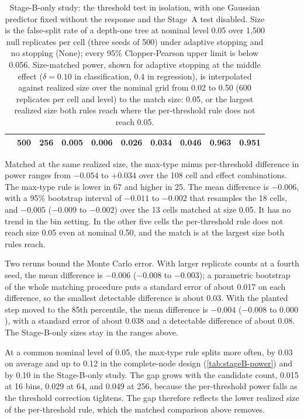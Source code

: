 \begin{table}[!htbp]
\begin{tabular}{@{}lrrrrrrrrr@{}}
     & 500 & 256 & 0.005 & 0.006 & 0.026 & 0.034 & 0.046 & 0.963 & 0.951 \\
    \bottomrule
  \end{tabular}
  \caption{Stage-B-only study: the threshold test in isolation, with one
  Gaussian predictor fixed without the response and the Stage~A test disabled.
  Size is the false-split rate of a depth-one tree at nominal level 0.05 over
  1,500 null replicates per cell (three seeds of 500) under adaptive stopping
  and no stopping (None); every 95\% Clopper-Pearson upper limit is below
  0.056. Size-matched power, shown for adaptive stopping at the middle effect
  ($\delta = 0.10$ in classification, $0.4$ in regression), is interpolated
  against realized size over the nominal grid from 0.02 to 0.50 (600 replicates
  per cell and level) to the match size: 0.05, or the largest realized size
  both rules reach where the per-threshold rule does not reach 0.05.}
  \label{tab:stageB-only}
\end{table}

Matched at the same realized size, the max-type minus per-threshold difference
in power ranges from $-0.054$ to $+0.034$ over the 108 cell and effect
combinations. The max-type rule is lower in 67 and higher in 25. The mean
difference is $-0.006$, with a 95\% bootstrap interval of $-0.011$ to $-0.002$
that resamples the 18 cells, and $-0.005$ ($-0.009$ to $-0.002$) over the 13
cells matched at size 0.05. It has no trend in the bin setting. In the other
five cells the per-threshold rule does not reach size 0.05 even at nominal
0.50, and the match is at the largest size both rules reach.

Two reruns bound the Monte Carlo error. With larger replicate counts at a
fourth seed, the mean difference is $-0.006$ ($-0.008$ to $-0.003$); a
parametric bootstrap of the whole matching procedure puts a standard error of
about 0.017 on each difference, so the smallest detectable difference is about
0.03. With the planted step moved to the 85th percentile, the mean difference
is $-0.004$ ($-0.008$ to $0.000$), with a standard error of about 0.038 and a
detectable difference of about 0.08. The Stage-B-only sizes stay in the ranges
above.

At a common nominal level of 0.05, the max-type rule splits more often, by 0.03
on average and up to 0.12 in the complete-node design (\cref{tab:stageB-power})
and by 0.10 in the Stage-B-only study. The gap grows with the candidate count,
0.015 at 16 bins, 0.029 at 64, and 0.049 at 256, because the per-threshold
power falls as the threshold correction tightens. The gap therefore reflects
the lower realized size of the per-threshold rule, which the matched
comparison above removes.

